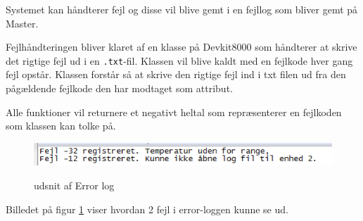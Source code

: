 
Systemet kan håndterer fejl og disse vil blive gemt i en fejllog som bliver gemt på Master. 

Fejlhåndteringen bliver klaret af en klasse på Devkit8000 som håndterer at skrive det rigtige fejl ud i en \verb+.txt+-fil. Klassen vil blive kaldt med en fejlkode hver gang fejl opstår. Klassen forstår så at skrive den rigtige fejl ind i txt filen ud fra den pågældende fejlkode den har modtaget som attribut. 

Alle funktioner vil returnere et negativt heltal som repræsenterer en fejlkoden som klassen kan tolke på.

\begin{figure}[htbp] \centering
{\includegraphics[scale=0.7]{filer/pics/Errortxt}}
\caption{udsnit af Error log}
\label{fig:ErrorLog}
\end{figure}

Billedet på figur \ref{fig:ErrorLog} viser hvordan 2 fejl i error-loggen kunne se ud.